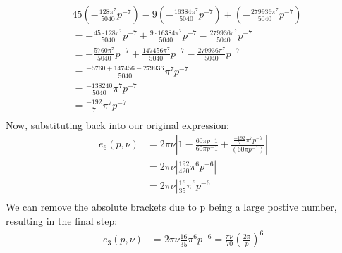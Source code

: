 \begin{equation}
	\begin{aligned}
		 & 45\left(-\frac{128\pi^7}{5040}p^{-7}\right) - 9\left(-\frac{16384\pi^7}{5040}p^{-7}\right) + \left(-\frac{279936\pi^7}{5040}p^{-7}\right) \\
		 & = -\frac{45 \cdot 128\pi^7}{5040}p^{-7} + \frac{9 \cdot 16384\pi^7}{5040}p^{-7} - \frac{279936\pi^7}{5040}p^{-7}                          \\
		 & = -\frac{5760\pi^7}{5040}p^{-7} + \frac{147456\pi^7}{5040}p^{-7} - \frac{279936\pi^7}{5040}p^{-7}                                         \\
		 & = \frac{-5760 + 147456 - 279936}{5040}\pi^7p^{-7}                                                                                         \\
		 & = \frac{-138240}{5040}\pi^7p^{-7}                                                                                                         \\
		 & = \frac{-192}{7}\pi^7p^{-7}                                                                                                               \\
	\end{aligned}
\end{equation}
Now, substituting back into our original expression:
\begin{equation}
	\begin{aligned}
		e_6(p, \nu) & = 2 \pi \nu \left|1- \frac{60 \pi p^-{1}}{60 \pi p^-{1} } + \frac{\frac{-192}{7}\pi^7p^{-7}}{(60 \pi p^{-1})}\right| \\
		            & = 2\pi\nu \left|\frac{192}{420}\pi^6 p^{-6}\right|                                                                   \\
		            & = 2\pi\nu \left|\frac{16}{35}\pi^6 p^{-6}\right|                                                                     \\
	\end{aligned}
\end{equation}
We can remove the absolute brackets due to p being a large postive number, resulting in the final step:
\begin{equation}
	\begin{aligned}
		e_3(p, \nu) & = 2\pi\nu \frac{16}{35}\pi^6 p^{-6} = \frac{\pi \nu}{70} \left ( \frac{2\pi}{p}\right)^6 \\
	\end{aligned}
\end{equation}
